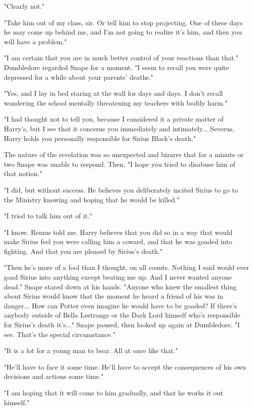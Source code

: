 \documentclass[a4paper,11pt]{article}
\begin{document}
"Clearly not."

"Take him out of my class, sir. Or tell him to stop projecting. One of these days he may come up behind me, and I'm not going to realize it's him, and then you will have a problem."

"I am certain that you are in much better control of your reactions than that." Dumbledore regarded Snape for a moment. "I seem to recall you were quite depressed for a while about your parents' deaths."

"Yes, and I lay in bed staring at the wall for days and days. I don't recall wandering the school mentally threatening my teachers with bodily harm."

"I had thought not to tell you, because I considered it a private matter of Harry's, but I see that it concerns you immediately and intimately... Severus, Harry holds you personally responsible for Sirius Black's death."

The nature of the revelation was so unexpected and bizarre that for a minute or two Snape was unable to respond. Then, "I hope you tried to disabuse him of that notion."

"I did, but without success. He believes you deliberately incited Sirius to go to the Ministry knowing and hoping that he would be killed."

"I tried to talk him out of it."

"I know. Remus told me. Harry believes that you did so in a way that would make Sirius feel you were calling him a coward, and that he was goaded into fighting. And that you are pleased by Sirius's death."

"Then he's more of a fool than I thought, on all counts. Nothing I said would ever goad Sirius into anything except beating me up. And I never wanted anyone dead." Snape stared down at his hands. "Anyone who knew the smallest thing about Sirius would know that the moment he heard a friend of his was in danger... How can Potter even imagine he would have to be goaded? If there's anybody outside of Bella Lestrange or the Dark Lord himself who's responsible for Sirius's death it's..." Snape paused, then looked up again at Dumbledore. "I see. That's the special circumstance."

"It is a lot for a young man to bear. All at once like that."

"He'll have to face it some time. He'll have to accept the consequences of his own decisions and actions some time."

"I am hoping that it will come to him gradually, and that he works it out himself."
\end{document}
